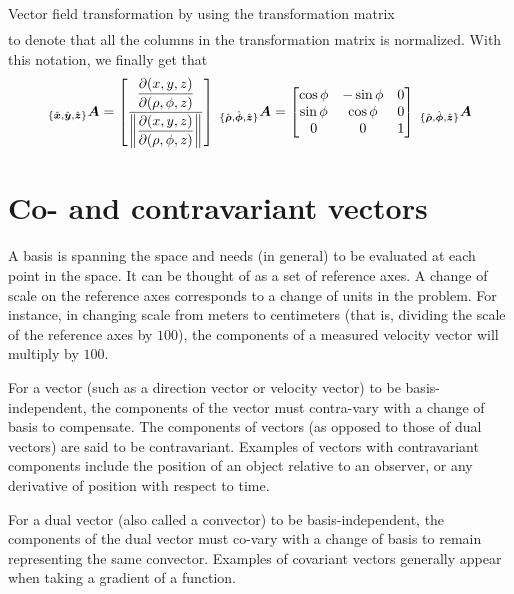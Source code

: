 \documentclass[a4paper, 12pt]{article}
\begin{document}
\begin{example}{Vector field transformation by using the transformation matrix}
\begin{align*}
 \end{align*}
 to denote that all the columns in the transformation matrix is normalized. 
With 
 this notation, we finally get that
 \begin{align*}
  _{\{\hat{\boldsymbol{x}}, \hat{\boldsymbol{y}}, \hat{\boldsymbol{z}}\}} \boldsymbol{A}
   =
     \left[
      \frac{\displaystyle \frac{\partial {(x, y, z)}}{\partial{(\rho, \phi, z)}}}{
            \displaystyle \left\|\frac{\partial {(x,y, z)}}{\partial{(\rho, \phi, z)}}\right\| } \right] \;
    _{\{\hat{\boldsymbol{\rho}}, \hat{\boldsymbol{\phi}},\hat{\boldsymbol{z}}\}}\boldsymbol{A}
   = \begin{bmatrix} \cos\phi & -\sin\phi & 0 \\
                     \sin\phi &  \cos\phi & 0 \\
                     0 & 0 & 1
  \end{bmatrix} \;
  _{\{\hat{\boldsymbol{\rho}}, \hat{\boldsymbol{\phi}},\hat{\boldsymbol{z}}\}}\boldsymbol{A}
 \end{align*}
\end{example}





\section{Co- and contravariant vectors}
A basis is spanning the space and needs (in general) to be evaluated at each 
point in the space. It can be thought of as a set of reference axes.
A change of scale on the reference axes corresponds to a change of units in the 
problem. For instance, in changing scale from meters to centimeters (that is, 
dividing the scale of the reference axes by $100$), the components of a 
measured velocity vector will multiply by $100$.

For a vector (such as a direction vector or velocity vector) to be 
basis-independent, the components of the vector must contra-vary with a change 
of basis to compensate. The components of vectors (as opposed to those of dual 
vectors) are said to be contravariant. Examples of vectors with contravariant 
components include the position of an object relative to an observer, or any 
derivative of position with respect to time.

For a dual vector (also called a convector) to be basis-independent, the 
components of the dual vector must co-vary with a change of basis to remain 
representing the same convector. Examples of covariant vectors generally appear 
when taking a gradient of a function.
\end{document}
